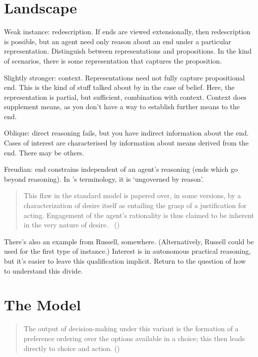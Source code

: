 \documentclass[10pt]{article}
\begin{document}
\newpage

\section{Landscape}
\label{sec:landscape}

Weak instance: redescription.
If ends are viewed extensionally, then redescription is possible, but an agent need only reason about an end under a particular representation.
Distinguish between representations and propositions.
In the kind of scenarios, there is some representation that captures the proposition.

Slightly stronger: context.
Representations need not fully capture propositional end.
This is the kind of stuff talked about by \citeauthor{Perry:1986aa} in the case of belief.
Here, the representation is partial, but sufficient, combination with context.
Context does supplement means, as you don't have a way to establish further means to the end.

Oblique: direct reasoning fails, but you have indirect information about the end.
Cases of interest are characterised by information about means derived from the end.
There may be others.

Freudian: end constrains independent of an agent's reasoning (ends which go beyond reasoning).
In \citeauthor{Velleman:2000ab}'s terminology, it is `ungoverned by reason'.
\begin{quote}
  This flaw in the standard model is papered over, in some versions, by a characterization of desire itself as entailing the grasp of a justification for acting.
  Engagement of the agent’s rationality is thus claimed to be inherent in the very nature of desire.\nolinebreak
  \mbox{ }\hfill(\cite[9]{Velleman:2000ab})
\end{quote}
There's also an example from Russell, somewhere.
(Alternatively, Russell could be used for the first type of instance.)
Interest is in autonomous practical reasoning, but it's easier to leave this qualification implicit.
Return to the question of how to understand this divide.

\newpage


\section{The Model}
\label{sec:model}

\begin{quote}
  The output of decision-making under this variant is the formation of a preference ordering over the options available in a choice; this then leads directly to choice and action.
  (\citeyear[138]{Pettit:2006aa})
\end{quote}
\end{document}
